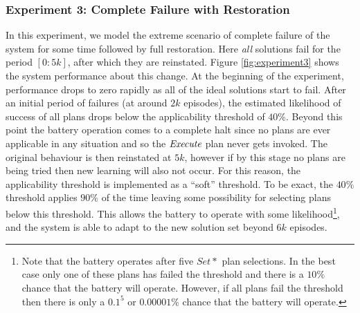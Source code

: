 %

\subsubsection{Experiment 3: Complete Failure with Restoration}

In this experiment, we model the extreme scenario of complete failure of the system for some time followed by full restoration. Here {\em all} solutions fail for the period $[0:5k]$, after which they are reinstated. Figure \ref{fig:experiment3} shows the system performance about this change. At the beginning of the experiment, performance drops to zero rapidly as all of the ideal solutions start to fail. After an initial period of failures (at around $2k$ episodes), the estimated likelihood of success of all plans drops below the applicability threshold of $40\%$. Beyond this point the battery operation comes to a complete halt since no plans are ever applicable in any situation and so the $\operatorname{\textit{Execute}}$ plan never gets invoked. The original behaviour is then reinstated at $5k$, however if by this stage no plans are being tried then new learning will also not occur. For this reason, the applicability threshold is implemented as a ``soft'' threshold. To be exact, the $40\%$ threshold applies $90\%$ of the time leaving some possibility for selecting plans below this threshold. This allows the battery to operate with some likelihood\footnote{Note that the battery operates after five $Set*$ plan selections. In the best case only one of these plans has failed the threshold and there is a $10\%$ chance that the battery will operate. However, if all plans fail the threshold then there is only a $0.1^5$ or $0.00001\%$ chance that the battery will operate.}, and the system is able to adapt to the new solution set beyond $6k$ episodes.

%


